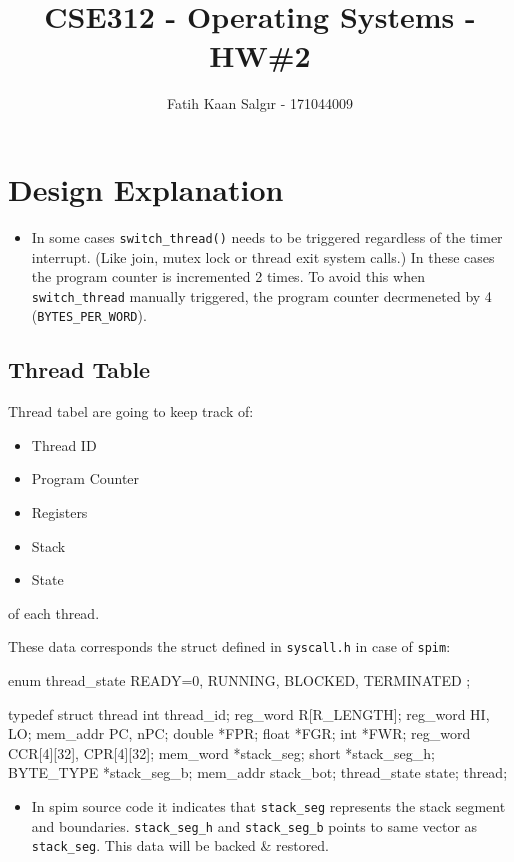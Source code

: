 \documentclass[a4paper]{article}
\author{Fatih Kaan Salgır - 171044009}
\date{}
\title{CSE312 - Operating Systems - HW\#2}
\begin{document}
\maketitle

\section*{Design Explanation}
\label{sec:orgff1804c}

\begin{itemize}
\item In some cases \texttt{switch\_thread()} needs to be triggered regardless of the timer interrupt. (Like join, mutex lock or thread exit system calls.) In these cases the program counter is incremented 2 times. To avoid this when \texttt{switch\_thread} manually triggered, the program counter decrmeneted by 4 (\texttt{BYTES\_PER\_WORD}).
\end{itemize}

\subsection*{Thread Table}
\label{sec:orgd39dc4d}
Thread tabel are going to keep track of: 
\begin{itemize}
\item Thread ID
\item Program Counter
\item Registers
\item Stack
\item State
\end{itemize}
of each thread.

These data corresponds the struct defined in \texttt{syscall.h} in case of \texttt{spim}:

\begin{ccode}
enum thread_state { READY=0, RUNNING, BLOCKED, TERMINATED };

typedef struct thread {
  int thread_id;
  reg_word R[R_LENGTH];
  reg_word HI, LO;
  mem_addr PC, nPC;
  double *FPR;
  float *FGR;
  int *FWR;
  reg_word CCR[4][32], CPR[4][32];
  mem_word *stack_seg;
  short *stack_seg_h;
  BYTE_TYPE *stack_seg_b;
  mem_addr stack_bot;
  thread_state state;
}thread;
\end{ccode}

\begin{itemize}
\item In spim source code it indicates that \texttt{stack\_seg} represents the stack segment and boundaries. \texttt{stack\_seg\_h} and \texttt{stack\_seg\_b} points to same vector as \texttt{stack\_seg}. This data will be backed \& restored.
\end{itemize}
\end{document}
